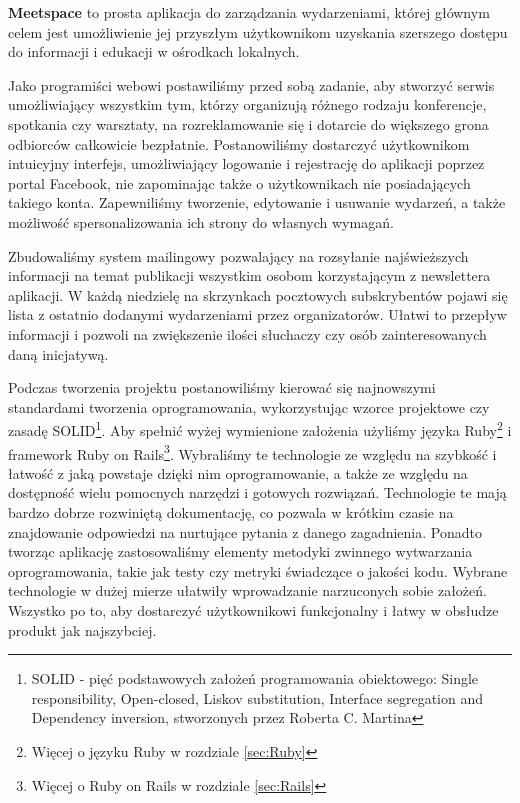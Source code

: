 \textbf{Meetspace} to prosta aplikacja do zarządzania wydarzeniami, której głównym celem jest umożliwienie jej przyszłym użytkownikom uzyskania szerszego dostępu do informacji i edukacji w ośrodkach lokalnych.


Jako programiści webowi postawiliśmy przed sobą zadanie, aby stworzyć serwis umożliwiający wszystkim tym, którzy organizują różnego rodzaju konferencje, spotkania czy warsztaty, na rozreklamowanie się i dotarcie do większego grona odbiorców całkowicie bezpłatnie.
Postanowiliśmy dostarczyć użytkownikom intuicyjny interfejs, umożliwiający logowanie i rejestrację do aplikacji poprzez portal Facebook, nie zapominając także o użytkownikach nie posiadających takiego konta. Zapewniliśmy tworzenie, edytowanie i usuwanie wydarzeń, a także
możliwość spersonalizowania ich strony do własnych wymagań.


Zbudowaliśmy system mailingowy pozwalający na rozsyłanie najświeższych informacji na temat publikacji wszystkim osobom korzystającym z newslettera aplikacji. W każdą niedzielę na skrzynkach pocztowych subskrybentów pojawi się lista z ostatnio dodanymi wydarzeniami przez organizatorów. Ułatwi to przepływ informacji i pozwoli na zwiększenie ilości słuchaczy czy osób zainteresowanych daną inicjatywą.

Podczas tworzenia projektu postanowiliśmy kierować się najnowszymi standardami tworzenia oprogramowania, wykorzystując wzorce projektowe czy zasadę SOLID\footnote{SOLID - pięć podstawowych założeń programowania obiektowego: Single responsibility, Open-closed, Liskov substitution, Interface segregation and Dependency inversion,  stworzonych przez Roberta C. Martina}. Aby spełnić wyżej wymienione założenia użyliśmy języka  Ruby\footnote{Więcej o języku Ruby w rozdziale \ref{sec:Ruby}} i framework  Ruby on Rails\footnote{Więcej o Ruby on Rails w rozdziale \ref{sec:Rails}}. Wybraliśmy te technologie ze względu na szybkość i łatwość z jaką powstaje dzięki nim oprogramowanie, a także ze względu na dostępność wielu pomocnych narzędzi i gotowych rozwiązań. Technologie te mają bardzo dobrze rozwiniętą dokumentację, co pozwala w krótkim czasie na znajdowanie odpowiedzi na nurtujące pytania z danego zagadnienia. Ponadto tworząc aplikację zastosowaliśmy elementy metodyki zwinnego wytwarzania oprogramowania, takie jak testy czy metryki świadczące o jakości kodu. Wybrane technologie w dużej mierze ułatwiły wprowadzanie narzuconych sobie założeń.
Wszystko po to, aby dostarczyć użytkownikowi funkcjonalny i łatwy w obsłudze produkt jak najszybciej.

